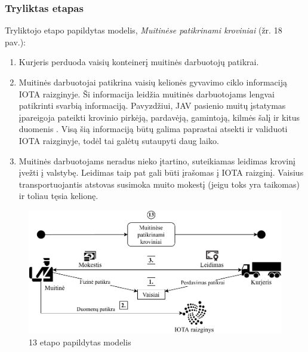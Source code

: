 
\subsubsection{Tryliktas etapas}

Tryliktojo etapo papildytas modelis, \textit{Muitinėse patikrinami kroviniai} (žr. 18 pav.):
\begin{enumerate}
    \item Kurjeris perduoda vaisių konteinerį muitinės darbuotojų patikrai.
    \item Muitinės darbuotojai patikrina vaisių kelionės gyvavimo ciklo informaciją IOTA raizginyje. Ši informacija leidžia muitinės darbuotojams lengvai patikrinti svarbią informaciją. Pavyzdžiui, JAV pasienio muitų įstatymas įpareigoja pateikti krovinio pirkėją, pardavėją, gamintoją, kilmės šalį ir kitus duomenis \cite{customs2018importer}. Visą šią informaciją būtų galima paprastai atsekti ir validuoti IOTA raizginyje, todėl tai galėtų sutaupyti daug laiko. 
    \item Muitinės darbuotojams neradus nieko įtartino, suteikiamas leidimas krovinį įvežti į valstybę. Leidimas taip pat gali būti įrašomas į IOTA raizginį. Vaisius transportuojantis atstovas susimoka muito mokestį (jeigu toks yra taikomas) ir toliau tęsia kelionę.
\end{enumerate}

\begin{figure}[H]
    \centering
    \includegraphics[scale=0.8]{images/iota-usecase-13}
    \caption{13 etapo papildytas modelis}
\end{figure}




